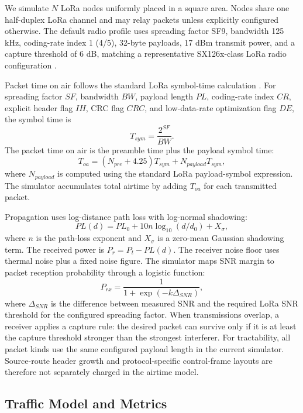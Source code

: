 \documentclass[conference]{IEEEtran}
\begin{document}
We simulate $N$ LoRa nodes uniformly placed in a square area. Nodes share one
half-duplex LoRa channel and may relay packets unless explicitly configured
otherwise. The default radio profile uses spreading factor SF9, bandwidth
125 kHz, coding-rate index 1 (4/5), 32-byte payloads, 17 dBm transmit power,
and a capture threshold of 6 dB, matching a representative SX126x-class LoRa
radio configuration \cite{semtech2024sx1262}.

Packet time on air follows the standard LoRa symbol-time calculation
\cite{semtech2013lora}. For spreading factor $SF$, bandwidth $BW$, payload
length $PL$, coding-rate index $CR$, explicit header flag $IH$, CRC flag $CRC$,
and low-data-rate optimization flag $DE$, the symbol time is
\begin{equation}
T_{sym}=\frac{2^{SF}}{BW}.
\end{equation}
The packet time on air is the preamble time plus the payload symbol time:
\begin{equation}
T_{oa}=(N_{pre}+4.25)T_{sym}+N_{payload}T_{sym},
\end{equation}
where $N_{payload}$ is computed using the standard LoRa payload-symbol
expression. The simulator accumulates total airtime by adding $T_{oa}$ for each
transmitted packet.

Propagation uses log-distance path loss with log-normal shadowing:
\begin{equation}
PL(d)=PL_0+10n\log_{10}(d/d_0)+X_\sigma,
\end{equation}
where $n$ is the path-loss exponent and $X_\sigma$ is a zero-mean Gaussian
shadowing term. The received power is $P_r=P_t-PL(d)$. The receiver noise floor
uses thermal noise plus a fixed noise figure. The simulator maps SNR margin to
packet reception probability through a logistic function:
\begin{equation}
P_{rx}=\frac{1}{1+\exp(-k\Delta_{SNR})},
\end{equation}
where $\Delta_{SNR}$ is the difference between measured SNR and the required
LoRa SNR threshold for the configured spreading factor. When transmissions
overlap, a receiver applies a capture rule: the desired packet can survive only
if it is at least the capture threshold stronger than the strongest interferer.
For tractability, all packet kinds use the same configured payload length in
the current simulator. Source-route header growth and protocol-specific
control-frame layouts are therefore not separately charged in the airtime
model.

\subsection{Traffic Model and Metrics}
\end{document}
